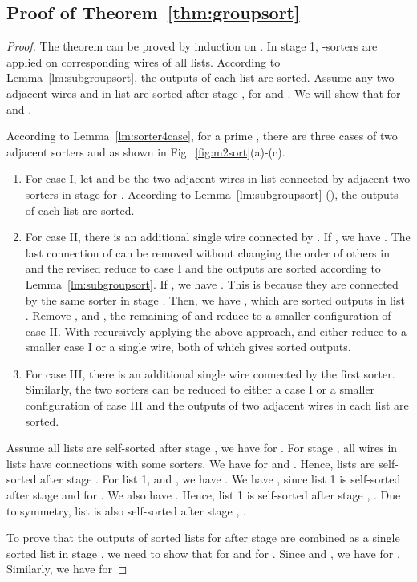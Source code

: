 \documentclass[10pt,journal,cspaper,compsoc]{IEEEtran}
\begin{document}
\subsection{Proof of Theorem~\ref{thm:groupsort}}
\label{pf:groupsort}
\begin{proof}
  The theorem can be proved by induction on .
  In stage 1, -sorters are applied on corresponding wires of all  lists. According to Lemma~\ref{lm:subgroupsort}, the outputs of each list are sorted.
  Assume any two adjacent wires  and  in list  are sorted after stage ,  for  and . We will show that  for  and .

  According to Lemma~\ref{lm:sorter4case}, for a prime , there are three cases of two adjacent sorters  and  as shown in Fig.~\ref{fig:m2sort}(a)-(c).
  \begin{enumerate}
    \item For case I, let  and  be the two adjacent wires in list  connected by adjacent two sorters in stage  for . According to Lemma~\ref{lm:subgroupsort} (), the outputs of each list are sorted.
    \item For case II, there is an additional single wire  connected by . If , we have . The last connection of  can be removed without changing the order of others in .
         and the revised  reduce to case I and the outputs are sorted according to Lemma~\ref{lm:subgroupsort}. If , we have . This is because they are connected by the same sorter in stage . Then, we have , which are sorted outputs in list . Remove , and , the remaining of  and  reduce to a smaller configuration of case II. With recursively applying the above approach,  and  either reduce to a smaller case I or a single wire, both of which gives sorted outputs.
    \item For case III, there is an additional single wire  connected by the first sorter. Similarly, the two sorters can be reduced to either a case I or a smaller configuration of case III and the outputs of two adjacent wires in each list are sorted.
  \end{enumerate}
  Assume all lists are self-sorted after stage , we have  for .
  For stage , all wires in lists  have connections with some sorters.
  We have  for  and . Hence, lists  are self-sorted after stage .
  For list 1,  and , we have . We have , since list 1 is self-sorted after stage  and  for . We also have . Hence, list 1 is self-sorted after stage , . Due to symmetry, list  is also self-sorted after stage , .



  To prove that the outputs of  sorted lists  for  after stage  are combined as a single sorted list in stage , we need to show that  for  and  for . Since  and , we have  for . Similarly, we have  for 
\end{proof}
\end{document}
